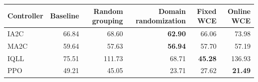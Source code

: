\begin{tabular}{lrrrrr}
\hline
Controller & Baseline & Random grouping & Domain randomization & Fixed WCE & Online WCE \\
\hline
IA2C & 66.84 & 68.60 & \textbf{62.90} & 66.06 & 73.98 \\
MA2C & 59.64 & 57.63 & \textbf{56.94} & 57.70 & 57.19 \\
IQLL & 75.51 & 111.73 & 68.71 & \textbf{45.28} & 136.93 \\
PPO & 49.21 & 45.05 & 23.71 & 27.62 & \textbf{21.49} \\
\hline
\end{tabular}
